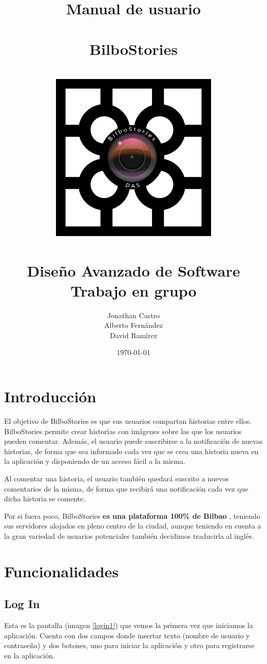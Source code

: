 \documentclass[11pt,a4paper, titlepage]{article}
\title{\huge{Manual de usuario}  \\ \ \\ \textbf{BilboStories} \\ \ \\ \includegraphics[width=0.6\textwidth]{./img/BilboStories.png} \\ \ \\ Diseño Avanzado de Software \\ Trabajo en grupo}
\author{Jonathan Castro \\ Alberto Fernández \\ David Ramírez}
\date{\today}
\begin{document}
	\maketitle
	
	\thispagestyle{empty}%
	\newpage
	\tableofcontents%
	\thispagestyle{empty}
	\newpage
	
	\setcounter{page}{1}
	
	\section{Introducción}
	
	El objetivo de BilboStories es que sus usuarios compartan historias entre ellos. BilboStories permite crear historias con imágenes sobre las que los usuarios pueden comentar. Además, el usuario puede suscribirse a la notificación de nuevas historias, de forma que sea informado cada vez que se crea una historia nueva en la aplicación y disponiendo de un acceso fácil a la misma.
	
	Al comentar una historia, el usuario también quedará suscrito a nuevos comentarios de la misma, de forma que recibirá una notificación cada vez que dicha historia se comente.
	
	Por si fuera poco, BilboStories \textbf{es una plataforma 100\% de \huge Bilbao} \normalsize, teniendo sus servidores alojados en pleno centro de la ciudad, aunque teniendo en cuenta a la gran variedad de usuarios potenciales también decidimos traducirla al inglés.
	
	
	\section{Funcionalidades}
	
	\subsection[Log In]{Log In}
	
	Esta es la pantalla (imagen \ref{login1}) que vemos la primera vez que iniciamos la aplicación. Cuenta con dos campos donde insertar texto (nombre de usuario y contraseña) y dos botones, uno para iniciar la aplicación y otro para  registrarse en la aplicación.
	
\end{document}
